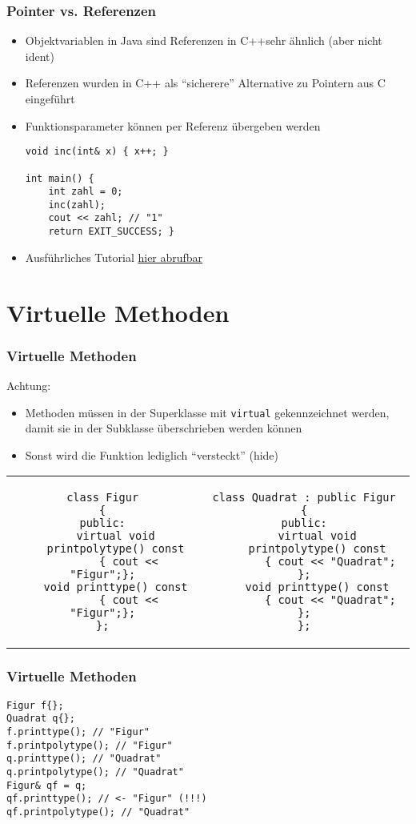 \documentclass[]{beamer}
\newcommand{\bi}{\begin{itemize}}
\newcommand{\ei}{\end{itemize}}
\begin{document}
\begin{frame}[fragile]
	\frametitle{Pointer vs. Referenzen}
	\bi
	\item Objektvariablen in Java sind Referenzen in C++\newline sehr ähnlich (aber nicht ident)
	\item Referenzen wurden in C++ als "`sicherere"' Alternative zu Pointern aus C eingeführt
	\item Funktionsparameter können per Referenz übergeben werden
	\begin{lstlisting}
void inc(int& x) { x++; }

int main() {
	int zahl = 0;
	inc(zahl);
	cout << zahl; // "1"
	return EXIT_SUCCESS; }
	\end{lstlisting}
	\item Ausführliches Tutorial  \href{https://www3.ntu.edu.sg/home/ehchua/programming/cpp/cp4_PointerReference.html}{hier abrufbar}
	\ei
\end{frame}

\section{Virtuelle Methoden}
\begin{frame}[fragile]
	\frametitle{Virtuelle Methoden}
	Achtung:
	\bi
	\item Methoden müssen in der Superklasse mit \lstinline|virtual| gekennzeichnet werden, damit sie in der Subklasse überschrieben werden können
	\item Sonst wird die Funktion lediglich "`versteckt"' (hide)
	\ei
	\begin{tabular}{c|c}
		\footnotesize 
		\begin{lstlisting}
class Figur
{
public:
	virtual void
	printpolytype() const
		{ cout << "Figur";};
	void printtype() const
		{ cout << "Figur";};
};
		\end{lstlisting}
		&
		\footnotesize
		\begin{lstlisting}
class Quadrat : public Figur
{
public:
	virtual void
	printpolytype() const
		{ cout << "Quadrat"; };
	void printtype() const
		{ cout << "Quadrat"; };
};
		\end{lstlisting}
		\normalsize
	\end{tabular}
\end{frame}

\begin{frame}[fragile]
	\frametitle{Virtuelle Methoden}
	\begin{lstlisting}
Figur f{};
Quadrat q{};
f.printtype(); // "Figur"
f.printpolytype(); // "Figur"
q.printtype(); // "Quadrat"
q.printpolytype(); // "Quadrat"
Figur& qf = q;
qf.printtype(); // <- "Figur" (!!!)
qf.printpolytype(); // "Quadrat"
	\end{lstlisting}
\end{frame}
\end{document}
